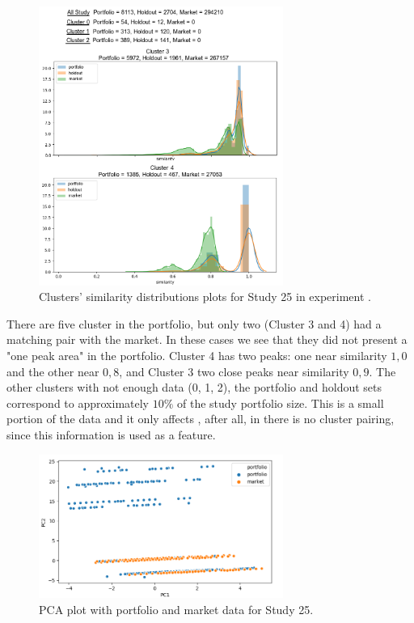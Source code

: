 \begin{figure}[!ht]
   \centering
   \includegraphics[width=8cm]{fig/ch4-study-25-clusters-simi-plot.png}
   \caption{Clusters' similarity distributions plots for Study 25 in experiment \nameExperimentI{}.}
   \label{fig:study-25-clusters-simi-plot}
\end{figure}

There are five cluster in the portfolio, but only two (Cluster 3 and 4) had a matching pair with the market. In these cases we see that they did not present a "one peak area" in the portfolio. Cluster 4 has two peaks: one near similarity $1,0$ and the other near $0,8$, and Cluster 3 two close peaks near similarity $0,9$. The other clusters with not enough data (0, 1, 2), the portfolio and holdout sets correspond to approximately $10\%$ of the study portfolio size. This is a small portion of the data and it only affects \nameExperimentI{}, after all, in \nameExperimentII{} there is no cluster pairing, since this information is used as a feature.

\begin{figure}[!ht]
   \centering
   \includegraphics[width=8cm]{fig/ch4-study-25-pca.png}
   \caption{PCA plot with portfolio and market data for Study 25.}
   \label{fig:study-25-pca}
\end{figure}

